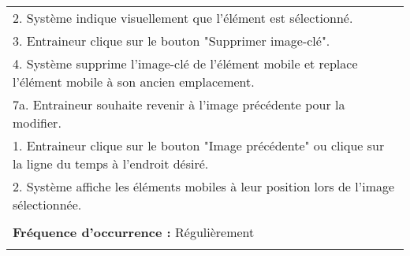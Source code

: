 \begin{longtable}{|p{16cm}|}
	\hspace{0.5cm}2. Système indique visuellement que l'élément est sélectionné.\\
	\hspace{0.5cm}3. Entraineur clique sur le bouton "Supprimer image-clé".\\
	\hspace{0.5cm}4. Système supprime l'image-clé de l'élément mobile et replace l'élément mobile à son ancien emplacement.\\
	7a. Entraineur souhaite revenir à l'image précédente pour la modifier.\\
	\hspace{0.5cm}1. Entraineur clique sur le bouton "Image précédente" ou clique sur la ligne du temps à l'endroit désiré.\\
	\hspace{0.5cm}2. Système affiche les éléments mobiles à leur position lors de l'image sélectionnée.\\
	\\
	\textbf{Fréquence d'occurrence :} Régulièrement\\
	\\
	\hline
\end{longtable}

